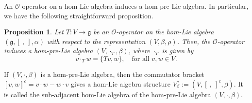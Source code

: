 \documentclass[a4paper,11pt]{amsart}
\theoremstyle{plain}
\newtheorem{proposition}[theorem]{Proposition}
\theoremstyle{definition}
\theoremstyle{remark}
\numberwithin{equation}{section}
\begin{document}
An $\mathcal{O}$-operator on a hom-Lie algebra induces a hom-pre-Lie algebra. In particular, we have the following straightforward proposition.

\begin{proposition}\label{induced hom-pre-Lie algebra}
Let $T:V\rightarrow \mathfrak{g}$ be an $\mathcal{O}$-operator on the hom-Lie algebra $(\mathfrak{g},[~,~],\alpha)$ with respect to the representation $(V,\beta, \rho)$. Then, the $\mathcal{O}$-operator induces a hom-pre-Lie algebra $(V,\cdot_T,\beta )$, where $\cdot_T$ is given by
$$v\cdot_T w= \{Tv,w\}, \quad \mbox{for all  }v, w\in V. $$
\end{proposition}



If $(V,\cdot,\beta)$ is a hom-pre-Lie algebra, then the commutator bracket $[v,w]^c=v\cdot w-w\cdot v$ gives a hom-Lie algebra structure $V^c_{\beta}:=(V,[~,~]^c,\beta)$. It is called the sub-adjacent hom-Lie algebra of the hom-pre-Lie algebra $(V,\cdot,\beta)$.
\end{document}
